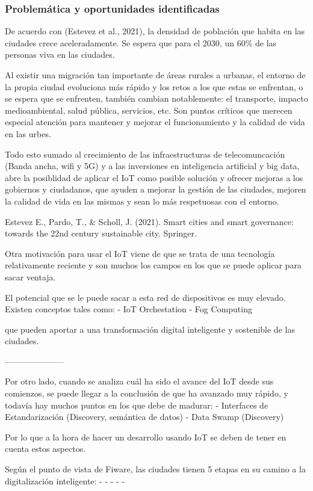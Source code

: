 \documentclass[12pt, a4paper, twoside]{article}
\begin{document}
\subsubsection{Problemática y oportunidades identificadas}
De acuerdo con (Estevez et al., 2021), la densidad de población que habita en las ciudades crece aceleradamente.
Se espera que para el 2030, un 60\% de las personas viva en las ciudades. 

Al existir una migración tan importante de áreas rurales a urbanas, el entorno de la
propia ciudad evoluciona más rápido y los retos a los que estas se enfrentan, o se espera que se enfrenten,
también cambian notablemente: el transporte, impacto medioambiental, salud pública, servicios, etc. Son puntos
críticos que merecen especial atención para mantener y mejorar el funcionamiento y la calidad de vida en
las urbes.

Todo esto sumado al crecimiento de las infraestructuras de telecomuncación (Banda ancha, wifi y 5G)
y a las inversiones en inteligencia artificial y big data, abre la posiblidad de aplicar el IoT como
posible solución y ofrecer mejoras a los gobiernos y ciudadanos, que ayuden a mejorar la gestión de las 
ciudades, mejoren la calidad de vida en las mismas y sean lo más respetuosas con el entorno.

Estevez E., Pardo, T., \& Scholl, J. (2021).
Smart cities and smart governance: towards the 22nd century sustainable city. Springer.


Otra motivación para usar el IoT viene de que se trata de  una tecnología relativamente reciente 
y son muchos los campos en los que se puede aplicar para sacar ventaja.

El potencial que se le puede sacar a esta red de dispositivos es muy elevado. Existen conceptos tales como:
 - IoT Orchestation
 - Fog Computing

que pueden aportar a una transformación digital inteligente y sostenible de las ciudades.


 ---------------------

Por otro lado, cuando se analiza cuál ha sido el avance del IoT desde sus comienzos,
se puede llegar a la conclusión de que ha avanzado muy rápido, y todavía hay muchos 
puntos en los que debe de madurar:
 - Interfaces de Estandarización (Discovery, semántica de datos)
 - Data Swamp (Discovery)

Por lo que a la hora de hacer un desarrollo usando IoT se deben de tener en cuenta estos aspectos.


 Según el punto de vista de Fiware, las ciudades tienen 5 etapas en su camino a la digitalización inteligente:
 -
 -
 -
 -
 -
\end{document}
